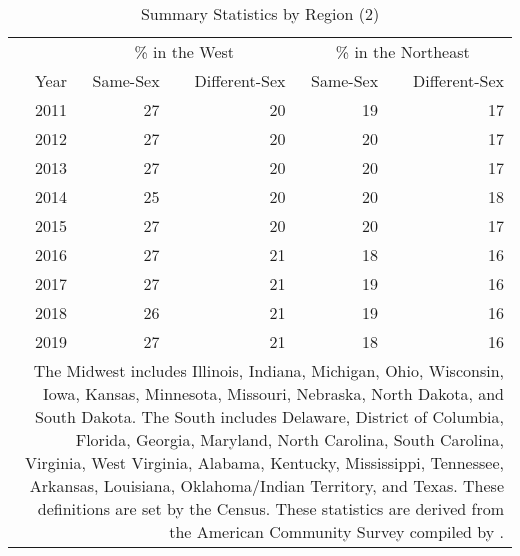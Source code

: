 \begin{table}[htbp]

\caption{Summary Statistics by Region (2)}
\label{region_2} %
\centering
\begin{tabular}[t]{rrrrr}
\toprule
\multicolumn{1}{c}{ } & \multicolumn{2}{c}{\% in the West} & \multicolumn{2}{c}{\% in the Northeast} \\
\cmidrule(l{3pt}r{3pt}){2-3} \cmidrule(l{3pt}r{3pt}){4-5}
Year & Same-Sex & Different-Sex & Same-Sex & Different-Sex\\
\midrule
2011 & 27 & 20 & 19 & 17\\
2012 & 27 & 20 & 20 & 17\\
2013 & 27 & 20 & 20 & 17\\
2014 & 25 & 20 & 20 & 18\\
2015 & 27 & 20 & 20 & 17\\
2016 & 27 & 21 & 18 & 16\\
2017 & 27 & 21 & 19 & 16\\
2018 & 26 & 21 & 19 & 16\\
2019 & 27 & 21 & 18 & 16\\
\bottomrule
\multicolumn{5}{p{.65\linewidth}}{\footnotesize The Midwest includes Illinois, Indiana, Michigan, Ohio, Wisconsin, Iowa, Kansas, Minnesota, Missouri, Nebraska, North Dakota, and South Dakota. The South includes Delaware, District of Columbia, Florida, Georgia, Maryland, North Carolina, South Carolina, Virginia, West Virginia, Alabama, Kentucky, Mississippi, Tennessee, Arkansas, Louisiana, Oklahoma/Indian Territory, and Texas. These definitions are set by the Census. These statistics are derived from the American Community Survey compiled by \citet{28}.} \\
\end{tabular}
\end{table}
